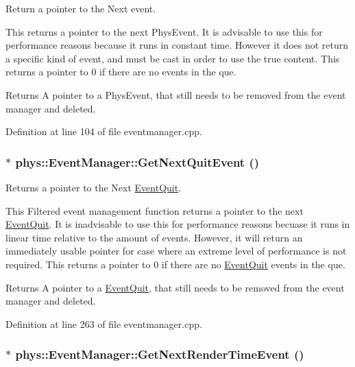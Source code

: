 Return a pointer to the Next event. 

This returns a pointer to the next PhysEvent. It is advisable to use this for performance reasons because it runs in constant time. However it does not return a specific kind of event, and must be cast in order to use the true content. This returns a pointer to 0 if there are no events in the que. \begin{DoxyReturn}{Returns}
A pointer to a PhysEvent, that still needs to be removed from the event manager and deleted. 
\end{DoxyReturn}


Definition at line 104 of file eventmanager.cpp.

\hypertarget{classphys_1_1EventManager_ad7da09e5422b1db79ac4187ee9198d0c}{
\subsubsection[{GetNextQuitEvent}]{ $\ast$ phys::EventManager::GetNextQuitEvent ()}}
\label{da/dde/classphys_1_1EventManager_ad7da09e5422b1db79ac4187ee9198d0c}


Returns a pointer to the Next \hyperlink{classphys_1_1EventQuit}{EventQuit}. 

This Filtered event management function returns a pointer to the next \hyperlink{classphys_1_1EventQuit}{EventQuit}. It is inadvisable to use this for performance reasons becuase it runs in linear time relative to the amount of events. However, it will return an immediately usable pointer for case where an extreme level of performance is not required. This returns a pointer to 0 if there are no \hyperlink{classphys_1_1EventQuit}{EventQuit} events in the que. \begin{DoxyReturn}{Returns}
A pointer to a \hyperlink{classphys_1_1EventQuit}{EventQuit}, that still needs to be removed from the event manager and deleted. 
\end{DoxyReturn}


Definition at line 263 of file eventmanager.cpp.

\hypertarget{classphys_1_1EventManager_ae8730b039a280449af052d75f2e60b06}{
\subsubsection[{GetNextRenderTimeEvent}]{ $\ast$ phys::EventManager::GetNextRenderTimeEvent ()}}
\label{da/dde/classphys_1_1EventManager_ae8730b039a280449af052d75f2e60b06}


